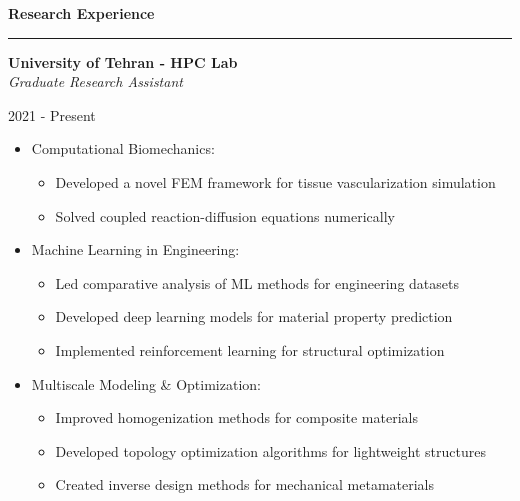\documentclass[11pt]{article}  %
\newenvironment{rSection}[1]{  %
    \vspace{0.5em}  %
    {\Large\bfseries\color{primary} #1}  %
    \vspace{0.3em}  %
    {\color{primary}\hrule height 2pt}  %
    \vspace{0.3em}  %
}{
    \vspace{0.05em}  %
}
\newenvironment{rSubsection}[4]{  %
    \vspace{0.1em}  %
    \begin{minipage}[t]{0.8\textwidth}  %
        \raggedright  %
        \textbf{#1} \\ \textit{\color{lighttext}#3}  %
    \end{minipage}%
    \hfill%
    \begin{minipage}[t]{0.2\textwidth}  %
        \raggedleft  %
        \color{lighttext}#2 \\ \textit{\color{lighttext}#4}  %
    \end{minipage}
    \vspace{-0.2em}  %
    \begin{itemize}[leftmargin=*,labelsep=0.4em,topsep=0pt,partopsep=0pt,parsep=0pt,itemsep=0.1em]  %
}{
    \end{itemize}
    \vspace{0.1em}  %
}
\begin{document}
\begin{rSection}{Research Experience}  %
    \begin{rSubsection}{\color{primary}University of Tehran - HPC Lab}{2021 - Present}{Graduate Research Assistant}{}  %
        \item Computational Biomechanics:  %
        \vspace{0.3em}
        \begin{itemize}[leftmargin=*,labelsep=0.5em]  %
            \item \small Developed a novel FEM framework for tissue vascularization simulation  %
            \item \small Solved coupled reaction-diffusion equations numerically  %
            \end{itemize}
        \vspace{0.3em}
        
        \item Machine Learning in Engineering:  %
        \vspace{0.3em}
        \begin{itemize}[leftmargin=*,labelsep=0.5em]  %
            \item \small Led comparative analysis of ML methods for engineering datasets  %
            \item \small Developed deep learning models for material property prediction  %
            \item \small Implemented reinforcement learning for structural optimization  %
            \end{itemize}
        \vspace{0.3em}
        
        \item Multiscale Modeling \& Optimization:  %
        \vspace{0.3em}
        \begin{itemize}[leftmargin=*,labelsep=0.5em]  %
            \item \small Improved homogenization methods for composite materials  %
            \item \small Developed topology optimization algorithms for lightweight structures  %
            \item \small Created inverse design methods for mechanical metamaterials  %
            \end{itemize}
        \end{rSubsection}


\end{rSection}
\end{document}
